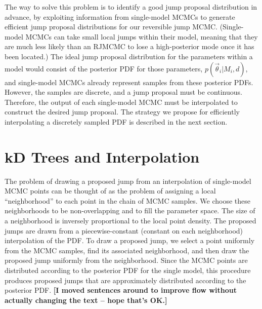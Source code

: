 \documentclass{iopart}
\newcommand{\vtheta}{\vec{\theta}}
\newcommand{\ilya}[1]{{\color{red} \bf #1}}
\begin{document}
The way to solve this problem is to identify a good jump proposal
distribution in advance, by exploiting information from single-model
MCMCs to generate efficient jump proposal distributions for our
reversible jump MCMC.  (Single-model MCMCs can take small local jumps
within their model, meaning that they are much less likely than an
RJMCMC to lose a high-posterior mode once it has been located.)  The
ideal jump proposal distribution for the parameters within a model
would consist of the posterior PDF for those parameters,
$p(\vtheta_i|M_i,d)$, and single-model MCMCs already represent samples
from these posterior PDFs.  However, the samples are discrete, and a
jump proposal must be continuous.  Therefore, the output of each
single-model MCMC must be interpolated to construct the desired jump
proposal.  The strategy we propose for efficiently interpolating
a discretely sampled PDF is described in the next section.

\section{kD Trees and Interpolation}
\label{sec:kDTree}


The problem of drawing a proposed jump from an interpolation of
single-model MCMC points can be thought of as the problem of assigning
a local ``neighborhood'' to each point in the chain of MCMC samples.
We choose these neighborhoods to be non-overlapping and to fill the parameter
space.  The size of a
neighborhood is inversely proportional to the local point density.
The proposed jumps are drawn from a piecewise-constant (constant on
each neighborhood) interpolation of the PDF.  
To draw a proposed jump, we select a point uniformly from the
MCMC samples, find its associated neighborhood, and then draw the
proposed jump uniformly from the neighborhood.  Since the MCMC points
are distributed according to the posterior PDF for the single model,
this procedure produces proposed jumps that are approximately
distributed according to the posterior PDF.  
\ilya{[I moved sentences around to improve flow without actually changing the text -- hope that's OK.]}
\end{document}
